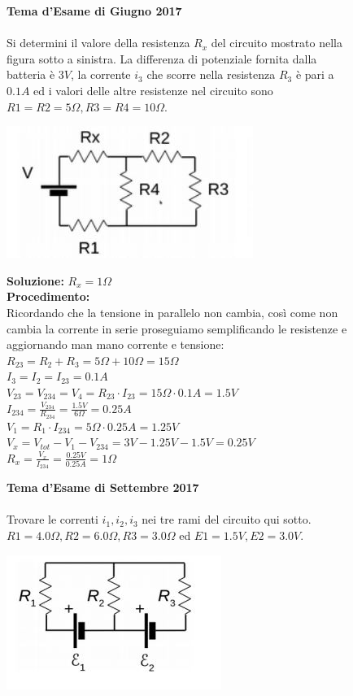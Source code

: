\begin{figure}[h!]
\textbf{Tema d'Esame di Giugno 2017}\\ \\
 Si determini il valore della resistenza $R_x$ del circuito mostrato nella figura sotto a sinistra. La differenza di potenziale fornita dalla batteria è $3 V$, la corrente $i_3$ che scorre nella resistenza $R_3$ è pari a $0.1 A$ ed i valori delle altre resistenze nel circuito
sono $R1 = R2 = 5 \Omega ,R3 = R4 = 10 \Omega$.
	\begin{center}
		\includegraphics[scale=1.1]{ES5/GIU052017.jpg}
	\end{center}
	\begin{boxed}
		\null\hfill \textbf{Soluzione:} $R_x = 1\Omega$\\
		\textbf{Procedimento: } \\
		Ricordando che la tensione in parallelo non cambia, così come non cambia la corrente in serie proseguiamo semplificando le resistenze e aggiornando man mano corrente e tensione:\\
		$R_{23}=R_2 + R_3=5\Omega + 10\Omega=15\Omega$\\
		$I_3=I_2=I_{23}=0.1A$\\
		$V_{23}=V_{234}=V_4=R_{23} \cdot I_{23}=15\Omega \cdot 0.1A=1.5V$\\
		$I_234=\frac{V_{234}}{R_{234}}=\frac{1.5V}{6\Omega}=0.25A$\\
		$V_1=R_1\cdot I_{234}=5\Omega \cdot 0.25A=1.25V$\\
		$V_x=V_{tot}- V_1 - V_{234}=3V - 1.25V -1.5V=0.25V$\\
		$R_x=\frac{V_x}{I_{234}}=\frac{0.25V}{0.25A}=1\Omega$
		\end{boxed}
\end{figure}

\begin{figure}[h!]
\textbf{Tema d'Esame di Settembre 2017}\\ \\
Trovare le correnti $i_1, i_2 , i_3$ nei tre rami del circuito qui sotto.
$R1 = 4.0 \Omega, R2 = 6.0 \Omega, R3 = 3.0 \Omega$ ed $ E 1 = 1.5 V,  E 2 = 3.0 V$.
\begin{center}
		\includegraphics[scale=1.1]{ES5/SET052017.jpg}
	\end{center}
\end{figure}